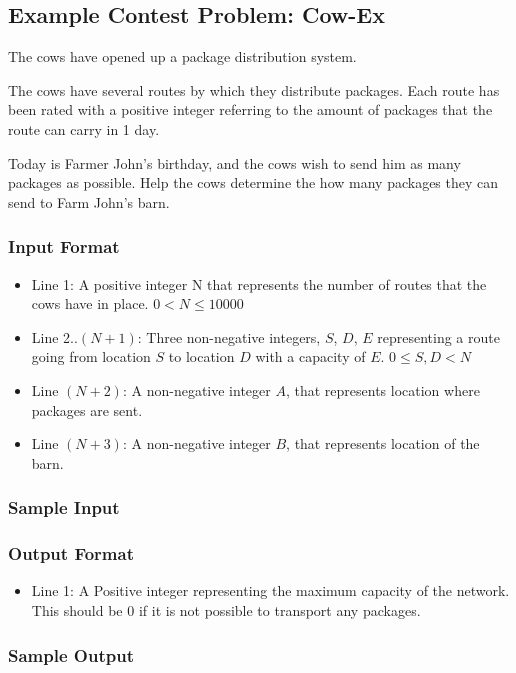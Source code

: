 \subsection{Example Contest Problem: Cow-Ex}
The cows have opened up a package distribution system.

The cows have several routes by which they distribute packages.
Each route has been rated with a positive integer referring to the amount of packages that the route can carry in 1 day.

Today is Farmer John's birthday, and the cows wish to send him as many packages as possible.
Help the cows determine the how many packages they can send to Farm John's barn.
\subsubsection{Input Format}
\begin{itemize}
	\item Line 1: A positive integer N that represents the number of routes that the cows have in place. $0 < N \leq 10000$
	\item Line 2..$(N+1)$: Three non-negative integers, $S$, $D$, $E$ representing a route going from location $S$ to location $D$ with a capacity of $E$. $0 \leq S,D < N$
	\item Line $(N+2)$: A non-negative integer $A$, that represents location where packages are sent.
	\item Line $(N+3)$: A non-negative integer $B$, that represents location of the barn.
\end{itemize}

\subsubsection{Sample Input}

\subsubsection{Output Format}
\begin{itemize}
	\item Line 1: A Positive integer representing the maximum capacity of the network.
		This should be 0 if it is not possible to transport any packages.
\end{itemize}
\subsubsection{Sample Output}
